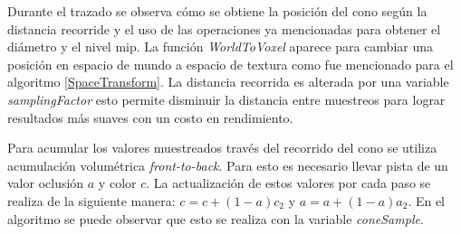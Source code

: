 Durante el trazado se observa cómo se obtiene la posición del cono según la distancia recorride y el uso de las operaciones ya mencionadas para obtener el diámetro y el nivel mip. La función \emph{WorldToVoxel} aparece para cambiar una posición en espacio de mundo a espacio de textura como fue mencionado para el algoritmo \ref{SpaceTransform}. La distancia recorrida es alterada por una variable \emph{samplingFactor} esto permite disminuir la distancia entre muestreos para lograr resultados más suaves con un costo en rendimiento.

Para acumular los valores muestreados través del recorrido del cono se utiliza acumulación volumétrica \emph{front-to-back}. Para esto es necesario llevar pista de un valor oclusión $a$ y color $c$. La actualización de estos valores por cada paso se realiza de la siguiente manera: $c=c+(1-a)c_2$ y $a=a+(1-a)a_2$. En el algoritmo se puede observar que esto se realiza con la variable \emph{coneSample}.


